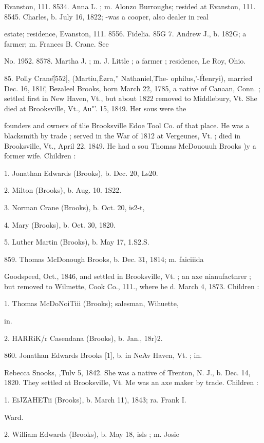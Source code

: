 Evanston, 111. 
8534. Anna L. ; m. Alonzo Burroughs; resided at Evanston, 111. 
8545. Charles, b. July 16, 1822; -was a cooper, also dealer in real 

estate; residence, Evanston, 111. 
8556. Fidelia. 
85G 7. Andrew J., b. 182G; a farmer; m. Frances B. Crane. See 

No. 1952. 
8578. Martha J. ; m. J. Little ; a farmer ; residence, Le Roy, Ohio. 

85. Polly Crane\^ [552], (Martiu,\^ Ezra,'' Nathaniel,\^ The- 
ophilus,'-\^ Henryi), married Dec. 16, 181i\^, Bezaleel Brooks, born 
March 22, 1785, a native of Canaan, Conn. ; settled first in New 
Haven, Vt., but about 1822 removed to Middlebury, Vt. She 
died at Brooksville, Vt., Au"'. 15, 1849. Her sous were the 




founders and owners of tlie Brooksville Edoe Tool Co. of that 
place. He was a blacksmith by trade ; served in the War of 
1812 at Vergeunes, Vt. ; died in Brooksville, Vt., April 22, 1849. 
He had a sou Thomas McDououuh Brooks )y a former wife. 
Children : 

1. Jonathan Edwards (Brooks), b. Dec. 20, Ls20. 

2. Milton (Brooks), b. Aug. 10. 1S22. 

3. Norman Crane (Brooks), b. Oct. 20, is2-t, 

4. Mary (Brooks), b. Oct. 30, 1820. 

5. Luther Martin (Brooks), b. May 17, 1.S2.S. 

859. Thomas McDonough Brooks, b. Dec. 31, 1814; m. faiciiida 

Goodspeed, Oct., 1846, and settled in Brooksville, Vt. ; an axe 
nianufactnrer ; but removed to Wilmette, Cook Co., 111., 
where he d. March 4, 1873. Children : 

1. Thomas McDoNoiTiii (Brooks); salesman, Wihuette, 

in. 

2. HARRiK/r Casendana (Brooks), b. Jan., 18r)2. 

860. Jonathan Edwards Brooks [1], b. in NeAv Haven, Vt. ; in. 

Rebecca Snooks, ,Tulv 5, 1842. She was a native of Trenton, 
N. J., b. Dec. 14, 1820. They settled at Brooksville, Vt. Me 
was an axe maker by trade. Children : 

1. EiJZAHETii (Brooks), b. March 11), 1843; ra. Frank I. 

Ward. 

2. William Edwards (Brooks), b. May 18, isls ; m. Josie 

